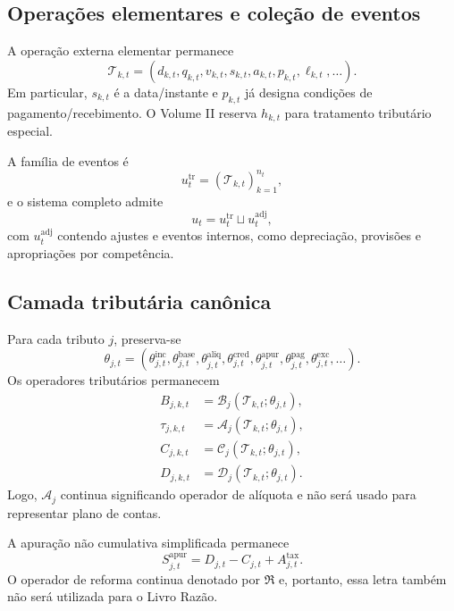 \documentclass[11pt,a4paper]{article}
\newcommand{\cT}{\mathcal{T}}
\newcommand{\cB}{\mathcal{B}}
\newcommand{\cA}{\mathcal{A}}
\newcommand{\cC}{\mathcal{C}}
\newcommand{\cD}{\mathcal{D}}
\begin{document}
\subsection{Operações elementares e coleção de eventos}

A operação externa elementar permanece
\begin{equation}
\boxed{
\cT_{k,t}=(d_{k,t},q_{k,t},v_{k,t},s_{k,t},a_{k,t},p_{k,t},\ell_{k,t},\ldots).
}
\label{eq:canonical-event}
\end{equation}
Em particular, $s_{k,t}$ é a data/instante e $p_{k,t}$ já designa condições de pagamento/recebimento. O Volume II reserva $h_{k,t}$ para tratamento tributário especial.

A família de eventos é
\begin{equation}
\boxed{u_t^{\mathrm{tr}}=(\cT_{k,t})_{k=1}^{n_t},}
\end{equation}
e o sistema completo admite
\begin{equation}
\boxed{u_t=u_t^{\mathrm{tr}}\sqcup u_t^{\mathrm{adj}},}
\end{equation}
com $u_t^{\mathrm{adj}}$ contendo ajustes e eventos internos, como depreciação, provisões e apropriações por competência.

\subsection{Camada tributária canônica}

Para cada tributo $j$, preserva-se
\begin{equation}
\boxed{
\theta_{j,t}=
(\theta_{j,t}^{\mathrm{inc}},\theta_{j,t}^{\mathrm{base}},\theta_{j,t}^{\mathrm{aliq}},
\theta_{j,t}^{\mathrm{cred}},\theta_{j,t}^{\mathrm{apur}},\theta_{j,t}^{\mathrm{pag}},\theta_{j,t}^{\mathrm{exc}},\ldots).
}
\end{equation}
Os operadores tributários permanecem
\begin{align}
B_{j,k,t}&=\cB_j(\cT_{k,t};\theta_{j,t}),\\
\tau_{j,k,t}&=\cA_j(\cT_{k,t};\theta_{j,t}),\\
C_{j,k,t}&=\cC_j(\cT_{k,t};\theta_{j,t}),\\
D_{j,k,t}&=\cD_j(\cT_{k,t};\theta_{j,t}).
\end{align}
Logo, $\cA_j$ continua significando operador de alíquota e não será usado para representar plano de contas.

A apuração não cumulativa simplificada permanece
\begin{equation}
\boxed{S_{j,t}^{\mathrm{apur}}=D_{j,t}-C_{j,t}+A_{j,t}^{\mathrm{tax}}.}
\end{equation}
O operador de reforma continua denotado por $\mathfrak R$ e, portanto, essa letra também não será utilizada para o Livro Razão.
\end{document}
